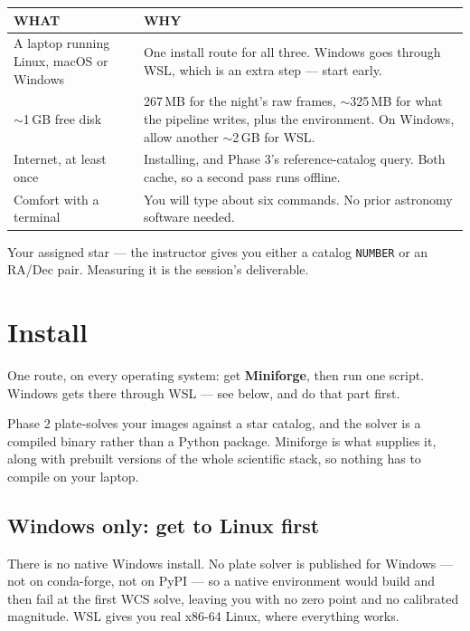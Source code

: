 \documentclass[11pt,a4paper]{article}
\newcommand{\cm}[1]{\texttt{\small #1}}
\newcommand{\thead}[1]{{\sffamily\bfseries\scriptsize\color{inkfaint}\MakeUppercase{#1}}}
\begin{document}
\vspace{4pt}
\begin{tabularx}{\textwidth}{@{}p{6.2cm}X@{}}
\toprule
\thead{What} & \thead{Why} \\
\midrule
A laptop running Linux, macOS or Windows & One install route for all three. Windows goes
through WSL, which is an extra step --- start early. \\
$\sim$1\,GB free disk & 267\,MB for the night's raw frames, $\sim$325\,MB for what the
pipeline writes, plus the environment. On Windows, allow another $\sim$2\,GB for WSL. \\
Internet, at least once & Installing, and Phase 3's reference-catalog query. Both cache, so a
second pass runs offline. \\
Comfort with a terminal & You will type about six commands. No prior astronomy software needed. \\
\bottomrule
\end{tabularx}

\begin{note}
Your assigned star --- the instructor gives you either a catalog \cm{NUMBER} or an RA/Dec pair.
Measuring it is the session's deliverable.
\end{note}

\section{Install}
One route, on every operating system: get \textbf{Miniforge}, then run one
script. Windows gets there through WSL --- see below, and do that part first.

\begin{note}
Phase 2 plate-solves your images against a star catalog, and the solver is a
compiled binary rather than a Python package. Miniforge is what supplies it,
along with prebuilt versions of the whole scientific stack, so nothing has to
compile on your laptop.
\end{note}

\subsection{Windows only: get to Linux first}
There is no native Windows install. No plate solver is published for Windows ---
not on conda-forge, not on PyPI --- so a native environment would build and then
fail at the first WCS solve, leaving you with no zero point and no calibrated
magnitude. WSL gives you real x86-64 Linux, where everything works.
\end{document}
